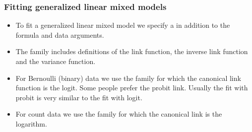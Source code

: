 \begin{frame}
  \frametitle{Fitting generalized linear mixed models}
  \begin{itemize}
  \item To fit a generalized linear mixed model we specify a
     in addition to the formula and data arguments.
  \item The family includes definitions of the link function, the
    inverse link function and the variance function.
  \item For Bernoulli (binary) data we use the  family
    for which the canonical link function is the logit.  Some people
    prefer the probit link.  Usually the fit with probit is very
    similar to the fit with logit.
  \item For count data we use the  family for which the
    canonical link is the logarithm.
  \end{itemize}
\end{frame}
